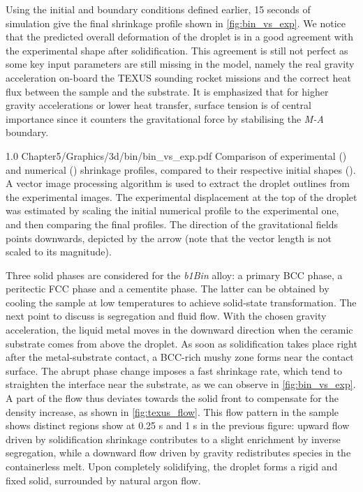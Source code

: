 Using the initial and boundary conditions defined earlier, 15 seconds of simulation give the final shrinkage profile shown in \cref{fig:bin_vs_exp}.
We notice that the predicted overall deformation of the droplet is in a good agreement with the experimental shape after solidification.
This agreement is still not perfect as some key input parameters are still missing in the model, 
namely the real gravity acceleration on-board the TEXUS sounding rocket missions 
and the correct heat flux between the sample and the substrate. 
It is emphasized that for higher gravity accelerations or lower heat transfer, surface tension is of central importance since 
it counters the gravitational force by stabilising the \emph{M-A} boundary.

\begin{figureth}
{1.0}
{Chapter5/Graphics/3d/bin/bin_vs_exp.pdf}
{Comparison of experimental () and numerical () shrinkage profiles, compared to their respective initial shapes (). 
A vector image processing algorithm is used to extract the droplet outlines from the experimental images. 
The experimental displacement at the top of the droplet was estimated by scaling 
the initial numerical profile to the experimental one, and then comparing the final profiles.
The direction of the gravitational fields points downwards, depicted
  by the arrow (note that the vector length is not scaled to its magnitude).}
\label{fig:bin_vs_exp}
\end{figureth}

Three solid phases are considered for the \emph{b1Bin} alloy: a primary BCC phase, a peritectic FCC phase and a cementite phase. 
The latter can be obtained by cooling the sample at low temperatures to achieve solid-state transformation.
The next point to discuss is segregation and fluid flow. With the chosen gravity acceleration, the liquid metal moves in the downward direction when the
ceramic substrate comes from above the droplet. As soon as solidification takes place right after the metal-substrate contact, a BCC-rich mushy zone 
forms near the contact surface. The abrupt phase change imposes a fast shrinkage rate, which tend to straighten the interface near the substrate, as we can observe in \cref{fig:bin_vs_exp}. 
A part of the flow thus deviates towards the solid front 
to compensate for the density increase, as shown in \cref{fig:texus_flow}. 
This flow pattern in the sample shows distinct regions show at 0.25 s and 1 s in the previous figure: 
upward flow driven by solidification shrinkage contributes to a slight enrichment by inverse segregation,
while a downward flow driven by gravity redistributes species in the containerless melt. Upon completely 
solidifying, the droplet forms a rigid and fixed solid, surrounded by natural argon flow. 

